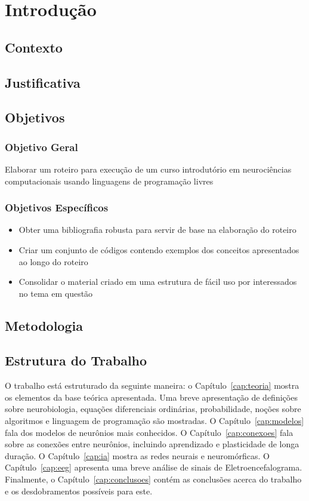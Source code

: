 \chapter{Introdução}\label{cap:introducao}
\section{Contexto}

\section{Justificativa}

\section{Objetivos}
\subsection{Objetivo Geral}
Elaborar um roteiro para execução de um curso introdutório em neurociências computacionais usando linguagens de programação livres

\subsection{Objetivos Específicos}
\begin{itemize}
\item Obter uma bibliografia robusta para servir de base na elaboração do roteiro
\item Criar um conjunto de códigos contendo exemplos dos conceitos apresentados ao longo do roteiro
\item Consolidar o material criado em uma estrutura de fácil uso por interessados no tema em questão
\end{itemize}

\section{Metodologia}

\section{Estrutura do Trabalho}
O trabalho está estruturado da seguinte maneira: o Capítulo~\ref{cap:teoria} mostra os elementos da base teórica apresentada. Uma breve apresentação de definições sobre neurobiologia, equações diferenciais ordinárias, probabilidade, noções sobre algoritmos e linguagem de programação são mostradas. O Capítulo~\ref{cap:modelos} fala dos modelos de neurônios mais conhecidos. O Capítulo~\ref{cap:conexoes} fala sobre as conexões entre neurônios, incluindo aprendizado e plasticidade de longa duração. O Capítulo~\ref{cap:ia} mostra as redes neurais e neuromórficas. O Capítulo~\ref{cap:eeg} apresenta uma breve análise de sinais de Eletroencefalograma. Finalmente, o Capítulo~\ref{cap:conclusoes} contém as conclusões acerca do trabalho e os desdobramentos possíveis para este.
